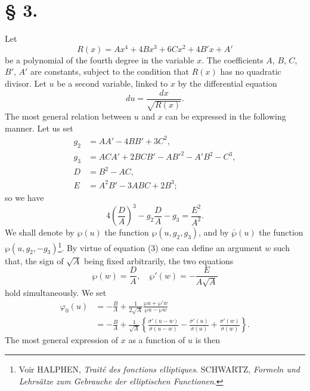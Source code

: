 \documentclass{article}
\begin{document}
\section*{§ 3.}
\setcounter{equation}{0}

Let
\[
R(x) = Ax^4 + 4Bx^3 + 6Cx^2 + 4B'x + A'
\]
be a polynomial of the fourth degree in the variable $x$. The coefficients $A$, $B$, $C$, $B'$, $A'$ are constants, subject to the condition that $R(x)$ has no quadratic divisor. Let $u$ be a second variable, linked to $x$ by the differential equation
\begin{equation}
{du} = \frac{dx}{\sqrt{R(x)}}.
\end{equation}
The most general relation between $u$ and $x$ can be expressed in the following manner.
Let us set
\begin{equation}
\begin{aligned}
g_2 &= AA' - 4BB' + 3C^2, \\
g_3 &= ACA' + 2BCB' - AB'^2 - A'B^2 - C^3, \\
D &= B^2 - AC, \\
E &= A^2B' - 3ABC + 2B^3;
\end{aligned}
\end{equation}
so we have
\begin{equation}
4\left(\frac{D}{A}\right)^3 - g_2\frac{D}{A} - g_3 = \frac{E^2}{A^2}.
\end{equation}
We shall denote by $\wp(u)$ the function $\wp(u, g_2, g_3)$, and by $\bar{\wp}(u)$ the function $\wp(u, g_2, -g_3)$\footnote{Voir HALPHEN, \textit{Traité des fonctions elliptiques}. SCHWARTZ, \textit{Formeln und Lehrsätze zum Gebrauche der elliptischen Functionen}.}. By virtue of equation (3) one can define an argument $w$ such that, the sign of $\sqrt{A}$ being fixed arbitrarily, the two equations
\begin{equation}
\wp(w) = \frac{D}{A}, \quad \wp'(w) = -\frac{E}{A\sqrt{A}}
\end{equation}
hold simultaneously. We set
\begin{equation}
\begin{aligned}
\varphi_0(u) &= -\frac{B}{A} + \frac{1}{2\sqrt{A}}\frac{\wp u + \wp'w}{\wp u - \wp w} \\
&= -\frac{B}{A} + \frac{1}{\sqrt{A}}\left\{\frac{\sigma'(u - w)}{\sigma(u - w)} - \frac{\sigma'(u)}{\sigma(u)} + \frac{\sigma'(w)}{\sigma(w)}\right\}.
\end{aligned}
\end{equation}
The most general expression of $x$ as a function of $u$ is then
\end{document}
